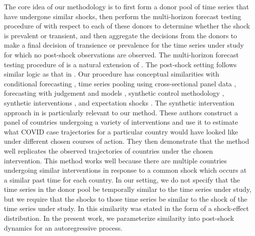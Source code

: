 \documentclass[11pt]{article}
\theoremstyle{definition}
\begin{document}
The core idea of our methodology is to first form a donor pool of time series that have undergone similar shocks, then perform the multi-horizon forecast testing procedure of \cite{quaedvlieg2021multi}  with respect to each of these donors to determine whether the shock is prevalent or transient, and then aggregate the decisions from the donors to make a final decision of transience or prevalence for the time series under study for which no post-shock observations are observed. The multi-horizon forecast testing procedure of \cite{quaedvlieg2021multi} is a natural  extension of \cite{diebold1995comparing}. The post-shock setting follows similar logic as that in \cite{lin2021minimizing}.
Our procedure has conceptual similarities with 
conditional forecasting \citep{baumeister2014real, kilian2017structural}, 
time series pooling using cross-sectional panel data \citep{ramaswamy1993empirical, pesaran1999pooled, hoogstrate2000pooling, baltagi2008forecasting, koop2012forecasting, liu2020forecasting}, 
forecasting with judgement and models \citep{svensson2005monetary, monti2008forecast}, 
synthetic control methodology \citep{abadie2010synthetic}, 
synthetic interventions \citep{agarwal2020synthetic, agarwal2020two}, 
and expectation shocks \citep{croushore2006data, baumeister2014general, clements2019measuring}. The synthetic intervention approach in \cite{agarwal2020two} is particularly relevant to our method. These authors construct a panel of countries undergoing a variety of interventions and use it to estimate what COVID case trajectories for a particular country would have looked like under different chosen courses of action. They then demonstrate that the method well replicates the observed trajectories of countries under the chosen intervention. This method works well because there are multiple countries undergoing similar interventions in response to a common shock which occurs at a similar past time for each country. In our setting, we do not specify that the time series in the donor pool be temporally similar to the time series under study, but we require that the shocks to those time series be similar to the shock of the time series under study. In \cite{lin2021minimizing} this similarity was stated in the form of a shock-effect distribution. In the present work, we parameterize similarity into post-shock dynamics for an autoregressive process. 
\end{document}
